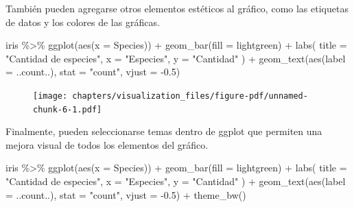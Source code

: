 \documentclass[
  letterpaper,
  DIV=11,
  numbers=noendperiod]{scrreprt}
\newenvironment{Shaded}{\begin{snugshade}}{\end{snugshade}}
\newcommand{\AttributeTok}[1]{\textcolor[rgb]{0.40,0.45,0.13}{#1}}
\newcommand{\FloatTok}[1]{\textcolor[rgb]{0.68,0.00,0.00}{#1}}
\newcommand{\FunctionTok}[1]{\textcolor[rgb]{0.28,0.35,0.67}{#1}}
\newcommand{\NormalTok}[1]{\textcolor[rgb]{0.00,0.23,0.31}{#1}}
\newcommand{\SpecialCharTok}[1]{\textcolor[rgb]{0.37,0.37,0.37}{#1}}
\newcommand{\StringTok}[1]{\textcolor[rgb]{0.13,0.47,0.30}{#1}}
\begin{document}
También pueden agregarse otros elementos estéticos al gráfico, como las
etiquetas de datos y los colores de las gráficas.

\begin{Shaded}
\begin{Highlighting}[]
\NormalTok{iris }\SpecialCharTok{\%\textgreater{}\%} 
  \FunctionTok{ggplot}\NormalTok{(}\FunctionTok{aes}\NormalTok{(}\AttributeTok{x =}\NormalTok{ Species)) }\SpecialCharTok{+}
  \FunctionTok{geom\_bar}\NormalTok{(}\AttributeTok{fill =} \StringTok{\textquotesingle{}lightgreen\textquotesingle{}}\NormalTok{) }\SpecialCharTok{+}
  \FunctionTok{labs}\NormalTok{(}
    \AttributeTok{title =} \StringTok{"Cantidad de especies"}\NormalTok{,}
    \AttributeTok{x =} \StringTok{"Especies"}\NormalTok{,}
    \AttributeTok{y =} \StringTok{"Cantidad"}
\NormalTok{  ) }\SpecialCharTok{+}
  \FunctionTok{geom\_text}\NormalTok{(}\FunctionTok{aes}\NormalTok{(}\AttributeTok{label =}\NormalTok{ ..count..), }\AttributeTok{stat =} \StringTok{"count"}\NormalTok{, }\AttributeTok{vjust =} \SpecialCharTok{{-}}\FloatTok{0.5}\NormalTok{)}
\end{Highlighting}
\end{Shaded}

\begin{figure}[H]

{\centering \texttt{[image: chapters/visualization\_files/figure-pdf/unnamed-chunk-6-1.pdf]}

}

\end{figure}

Finalmente, pueden seleccionarse temas dentro de ggplot que permiten una
mejora visual de todos los elementos del gráfico.

\begin{Shaded}
\begin{Highlighting}[]
\NormalTok{iris }\SpecialCharTok{\%\textgreater{}\%} 
  \FunctionTok{ggplot}\NormalTok{(}\FunctionTok{aes}\NormalTok{(}\AttributeTok{x =}\NormalTok{ Species)) }\SpecialCharTok{+}
  \FunctionTok{geom\_bar}\NormalTok{(}\AttributeTok{fill =} \StringTok{\textquotesingle{}lightgreen\textquotesingle{}}\NormalTok{) }\SpecialCharTok{+}
  \FunctionTok{labs}\NormalTok{(}
    \AttributeTok{title =} \StringTok{"Cantidad de especies"}\NormalTok{,}
    \AttributeTok{x =} \StringTok{"Especies"}\NormalTok{,}
    \AttributeTok{y =} \StringTok{"Cantidad"}
\NormalTok{  ) }\SpecialCharTok{+}
  \FunctionTok{geom\_text}\NormalTok{(}\FunctionTok{aes}\NormalTok{(}\AttributeTok{label =}\NormalTok{ ..count..), }\AttributeTok{stat =} \StringTok{"count"}\NormalTok{, }\AttributeTok{vjust =} \SpecialCharTok{{-}}\FloatTok{0.5}\NormalTok{) }\SpecialCharTok{+}
  \FunctionTok{theme\_bw}\NormalTok{()}
\end{Highlighting}
\end{Shaded}
\end{document}

